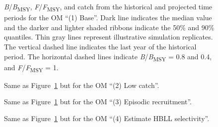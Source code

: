 \documentclass[11pt]{book}
\begin{document}
\begin{figure}[htb]

{\centering {} 

}

\caption{\emph{B}/\emph{B}\textsubscript{MSY}, \emph{F}/\emph{F}\textsubscript{MSY}, and catch from the historical and projected time periods for the OM ``(1) Base''. Dark line indicates the median value and the darker and lighter shaded ribbons indicate the 50\% and 90\% quantiles. Thin gray lines represent illustrative simulation replicates. The vertical dashed line indicates the last year of the historical period. The horizontal dashed lines indicate \emph{B}/\emph{B}\textsubscript{MSY} = 0.8 and 0.4, and \emph{F}/\emph{F}\textsubscript{MSY} = 1.}\label{fig:proj-updog-fixsel}
\end{figure}

\begin{figure}[htb]

{\centering {} 

}

\caption{Same as Figure~\ref{fig:proj-updog-fixsel} but for the OM ``(2) Low catch''.}\label{fig:proj-low-catch}
\end{figure}

\begin{figure}[htb]

{\centering {} 

}

\caption{Same as Figure~\ref{fig:proj-updog-fixsel} but for the OM ``(3) Episodic recruitment''.}\label{fig:proj-episodic-recruitment}
\end{figure}

\begin{figure}[htb]

{\centering {} 

}

\caption{Same as Figure~\ref{fig:proj-updog-fixsel} but for the OM ``(4) Estimate HBLL selectivity''.}\label{fig:proj-upweight-dogfish}
\end{figure}
\clearpage
\end{document}
